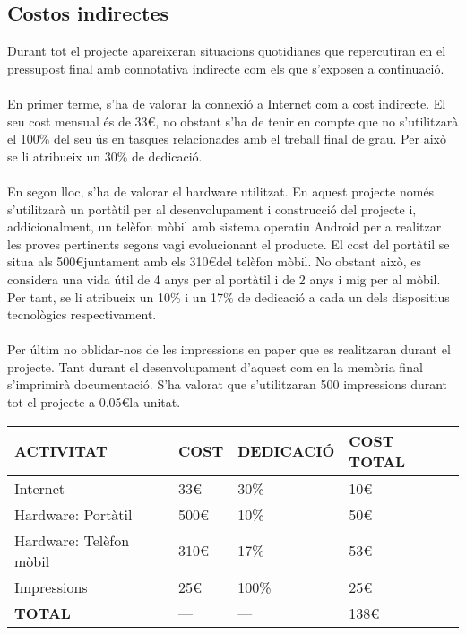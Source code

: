 \subsection{Costos indirectes}

Durant tot el projecte apareixeran situacions quotidianes que repercutiran en el pressupost final amb connotativa indirecte com els que s’exposen a continuació.
\\\\
En primer terme, s’ha de valorar la connexió a Internet com a cost indirecte. El seu cost mensual és de 33\euro, no obstant s’ha de tenir en compte que no s’utilitzarà el 100\% del seu ús en tasques relacionades amb el treball final de grau. Per això se li atribueix un 30\% de dedicació.
\\\\
En segon lloc, s’ha de valorar el hardware utilitzat. En aquest projecte només s’utilitzarà un portàtil per al desenvolupament i construcció del projecte i, addicionalment, un telèfon mòbil amb sistema operatiu Android per a realitzar les proves pertinents segons vagi evolucionant el producte. El cost del portàtil se situa als 500\euro\space juntament amb els 310\euro\space del telèfon mòbil. No obstant això, es considera una vida útil de 4 anys per al portàtil i de 2 anys i mig per al mòbil. Per tant, se li atribueix un 10\% i un 17\% de dedicació a cada un dels dispositius tecnològics respectivament.
\\\\
Per últim no oblidar-nos de les impressions en paper que es realitzaran durant el projecte. Tant durant el desenvolupament d’aquest com en la memòria final s’imprimirà documentació. S’ha valorat que s’utilitzaran 500 impressions durant tot el projecte a 0.05\euro\space la unitat.
\\
\begin{center}
    \begin{tabular}{ | l | l | l | l |}
    \hline
	\textbf{ACTIVITAT}&\textbf{COST}&\textbf{DEDICACIÓ}&\textbf{COST TOTAL} 		\\ \hline
    Internet						 	& 33\euro	& 30\%			& 10\euro			\\ \hline
    Hardware: Portàtil				 	& 500\euro	& 10\%			& 50\euro			\\ \hline
    Hardware: Telèfon mòbil			 	& 310\euro	& 17\%			& 53\euro			\\ \hline
    Impressions						 	& 25\euro	& 100\%			& 25\euro			\\ \hline
    \textbf{TOTAL}					 	& --- 		& ---			& 138\euro			\\ 
    \hline
    \end{tabular}
\end{center}

